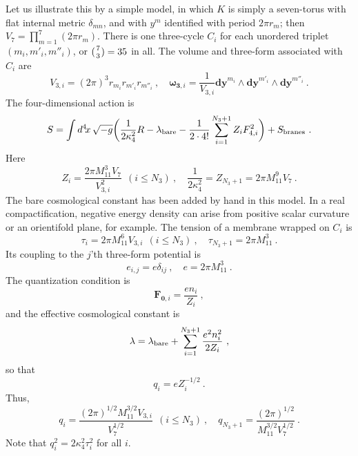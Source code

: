 \documentclass[12pt]{article}
\begin{document}
Let us illustrate this by a simple model, in which $K$ is simply a
seven-torus with flat internal metric $\delta_{mn}$, and with $y^m$
identified with period $2\pi r_m$; then $V_7 = \prod_{m=1}^7 (2\pi
r_m)$.  There is one three-cycle $C_i$ for each unordered triplet
$(m_i,m'_i,m''_i)$, or $( {7\atop 3} ) = 35$ in all.  The volume and
three-form associated with $C_i$ are
\begin{equation}
V_{3,i} = (2\pi)^3 r_{m_i} r_{m'_i} r_{m''_i}\ ,\quad
\mathbf{\omega}_{{\mathbf 3},i} = \frac{1}{V_{3,i}} \mathbf{dy}^{m_i}
\wedge \mathbf{dy}^{m'_i} \wedge \mathbf{dy}^{m''_i}\ .
\end{equation}
The four-dimensional action is
\begin{equation}
S = \int d^4\!x\, \sqrt{-g} \biggl( \frac{1}{2\kappa_4^2} R -
    \lambda_{\rm bare} -  \frac{1}{2\cdot4!} \sum_{i = 1}^{N_3+1}
{Z_i} F_{4,i}^2
\biggr) + S_{\rm branes}\ .
\end{equation}
Here
\begin{equation}
Z_i = \frac{2\pi M_{11}^3 V_7 }{ V_{3,i}^2}\ \ (i \leq N_3)\ ,
\quad \frac{1}{2\kappa_4^2} = Z_{N_3+1} ={2\pi M_{11}^9 V_7 }\ .
\label{eq-k4}
\end{equation}
The bare cosmological constant has been added by hand in this model.
In a real compactification, negative energy density can arise from
positive scalar curvature or an orientifold plane, for example.  The
tension of a membrane wrapped on $C_i$ is
\begin{equation}
\tau_i = {2\pi M_{11}^6
V_{3,i}}\ \ (i \leq N_3)\ ,\quad \tau_{N_3+1} =
{2\pi M_{11}^3}\ . \label{eq-tau}
\end{equation}
Its coupling to the $j$'th three-form potential is
 \begin{equation}
e_{i,j} = e \delta_{ij} \ , \quad e = {2\pi M_{11}^3} \ .
\end{equation}
The quantization condition is
\begin{equation}
\mathbf{F}_{\mathbf{0},i} = \frac{e n_i}{Z_i}\ ,
\end{equation}
and the effective cosmological constant is
\begin{equation}
\lambda = \lambda_{\rm bare} + \sum_{i=1}^{N_3+1}
\frac{e^2 n_i^2}{2 Z_i} \ ,
\end{equation}
so that
\begin{equation}
q_i =
e Z_i^{-1/2}\ .
\end{equation}
Thus,
\begin{equation}
q_i = \frac{(2\pi)^{1/2} M_{11}^{3/2} V_{3,i}}{ V_7^{1/2} }\ \
(i \leq N_3)\ ,
\quad  q_{N_3+1} =\frac{(2\pi)^{1/2}}{ M_{11}^{3/2} V_7^{1/2} }\ .
\label{eq-e_i}
\end{equation}
Note that $q_i^2 = 2\kappa_4^2 \tau_i^2$ for all $i$.
\end{document}
